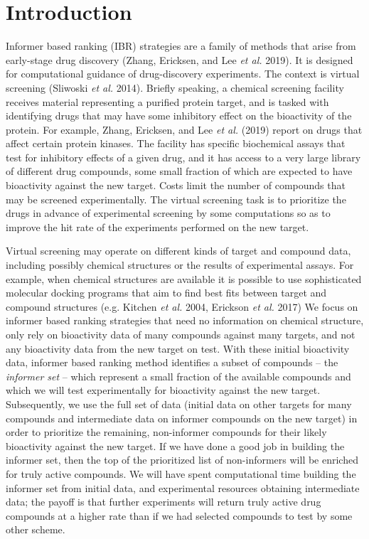\documentclass[12pt]{article}
\begin{document}
\doublespacing


\section{Introduction} \label{sec:introduction}
Informer based ranking (IBR) strategies are a family of methods that arise from early-stage drug discovery (Zhang, Ericksen, and Lee {\em et al.} 2019). It is designed for computational guidance of drug-discovery experiments. The context is virtual screening (Sliwoski {\em et al.} 2014).  Briefly speaking, a chemical screening facility receives material representing a purified protein target, and is tasked with identifying drugs that may have some inhibitory effect on the bioactivity of the protein.  For example, Zhang, Ericksen, and Lee {\em et al.} (2019) report on drugs that affect certain protein kinases.
The facility has specific biochemical assays that test for inhibitory effects of a given drug, and it has access to a very large library of different drug compounds, some small fraction of which are expected to have bioactivity against the new target.   
Costs limit the number of compounds that may be screened experimentally.   The virtual screening task is to prioritize the drugs in advance of experimental screening by some computations so as to
improve the hit rate of the experiments performed on the new target.

Virtual screening may operate on different kinds of target and compound data, including possibly chemical structures or the results of experimental assays.   For example, when chemical structures are available it is possible to use sophisticated molecular docking programs that aim to find best fits between target and compound structures (e.g. Kitchen {\em et al.} 2004, Erickson {\em et al.} 2017)
We focus on informer based ranking strategies that need no information on chemical structure, only rely on bioactivity data of many compounds against many targets, and not any bioactivity data from the new target on test.  With these initial bioactivity data,   informer based ranking method
identifies a subset of compounds -- the {\em informer set} -- which
represent a small fraction of the available compounds and which we
will test experimentally for bioactivity against the new target.  Subsequently, we use the full set of data (initial data on other targets
for many compounds and intermediate data on informer compounds on 
the new target) in order to prioritize the remaining, non-informer
compounds for their likely bioactivity against the new target.  If
we have done a good job in building the informer set, then the 
top of the prioritized list of non-informers will be enriched
for truly active compounds.  We will have spent computational time
building the informer set from initial data, and experimental resources
obtaining intermediate data; the payoff is that further experiments
will return truly active drug compounds at  a higher rate than
if we had selected compounds to test by some other scheme.
\end{document}
